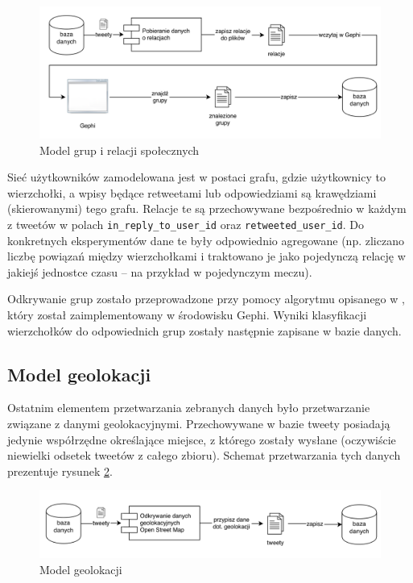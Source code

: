 \begin{figure}[ht!]
\centering
\includegraphics[width=160mm]{img/odkrywanie-relacji.png}
\caption{Model grup i relacji społecznych}
\label{image:odkrywanie-relacji}
\end{figure}


Sieć użytkowników zamodelowana jest w postaci grafu, gdzie użytkownicy to
wierzchołki, a wpisy będące retweetami lub odpowiedziami są krawędziami
(skierowanymi) tego grafu. Relacje te są przechowywane bezpośrednio w każdym z
tweetów w polach \texttt{in\_reply\_to\_user\_id} oraz
\texttt{retweeted\_user\_id}.
Do konkretnych eksperymentów dane te były odpowiednio agregowane (np. zliczano
liczbę powiązań między wierzchołkami i traktowano je jako pojedynczą relację w
jakiejś jednostce czasu -- na przykład w pojedynczym meczu).

Odkrywanie grup zostało przeprowadzone przy pomocy algorytmu opisanego w
\cite{FastUnfoldingOfCommunites}, który został zaimplementowany w środowisku
Gephi. Wyniki klasyfikacji wierzchołków do odpowiednich grup zostały następnie
zapisane w bazie danych.


\subsection{Model geolokacji}
\label{subsection:modelgeolokacji}
Ostatnim elementem przetwarzania zebranych danych było przetwarzanie związane z
danymi geolokacyjnymi. Przechowywane w bazie tweety posiadają jedynie współrzędne
określające miejsce, z którego zostały wysłane (oczywiście niewielki odsetek
tweetów z całego zbioru). Schemat przetwarzania tych danych prezentuje rysunek
\ref{image:odkrywanie-geolokacji}.

\begin{figure}[ht!]
\centering
\includegraphics[width=160mm]{img/odkrywanie-geolokacji.png}
\caption{Model geolokacji}
\label{image:odkrywanie-geolokacji}
\end{figure}

